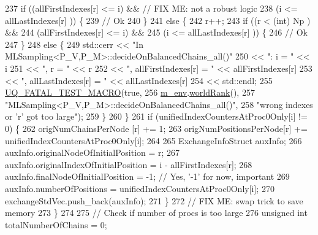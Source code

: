 \begin{DoxyCode}
237         \textcolor{keywordflow}{if} ((allFirstIndexes[r] <= i) && \textcolor{comment}{// FIX ME: not a robust logic}
238             (i <= allLastIndexes[r] )) \{
239           \textcolor{comment}{// Ok}
240         \}
241         \textcolor{keywordflow}{else} \{
242           r++;
243           \textcolor{keywordflow}{if} ((r < (\textcolor{keywordtype}{int}) Np           ) &&
244               (allFirstIndexes[r] <= i) &&
245               (i <= allLastIndexes[r] )) \{
246             \textcolor{comment}{// Ok}
247           \}
248           \textcolor{keywordflow}{else} \{
249       std::cerr << \textcolor{stringliteral}{"In MLSampling<P\_V,P\_M>::decideOnBalancedChains\_all()"}
250                       << \textcolor{stringliteral}{": i = "} << i
251                       << \textcolor{stringliteral}{", r = "} << r
252                       << \textcolor{stringliteral}{", allFirstIndexes[r] = "} << allFirstIndexes[r]
253                       << \textcolor{stringliteral}{", allLastIndexes[r] = "}  << allLastIndexes[r]
254                       << std::endl;
255             \hyperlink{_defines_8h_a56d63d18d0a6d45757de47fcc06f574d}{UQ\_FATAL\_TEST\_MACRO}(\textcolor{keyword}{true},
256                                 \hyperlink{class_q_u_e_s_o_1_1_m_l_sampling_a13f1ca4fe9f94822fe572a743eaced1d}{m\_env}.\hyperlink{class_q_u_e_s_o_1_1_base_environment_a78b57112bbd0e6dd0e8afec00b40ffa7}{worldRank}(),
257                                 \textcolor{stringliteral}{"MLSampling<P\_V,P\_M>::decideOnBalancedChains\_all()"},
258                                 \textcolor{stringliteral}{"wrong indexes or 'r' got too large"});
259           \}
260         \}
261         \textcolor{keywordflow}{if} (unifiedIndexCountersAtProc0Only[i] != 0) \{
262           origNumChainsPerNode   [r] += 1;
263           origNumPositionsPerNode[r] += unifiedIndexCountersAtProc0Only[i];
264 
265           ExchangeInfoStruct auxInfo;
266           auxInfo.originalNodeOfInitialPosition  = r;
267           auxInfo.originalIndexOfInitialPosition = i - allFirstIndexes[r];
268           auxInfo.finalNodeOfInitialPosition     = -1; \textcolor{comment}{// Yes, '-1' for now, important}
269           auxInfo.numberOfPositions              = unifiedIndexCountersAtProc0Only[i];
270           exchangeStdVec.push\_back(auxInfo);
271         \}
272         \textcolor{comment}{// FIX ME: swap trick to save memory}
273       \}
274 
275       \textcolor{comment}{// Check if number of procs is too large}
276       \textcolor{keywordtype}{unsigned} \textcolor{keywordtype}{int} totalNumberOfChains = 0;

\end{DoxyCode}
